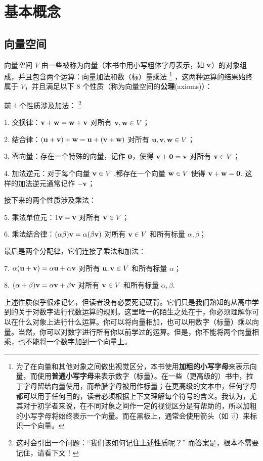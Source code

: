 \chapter{基本概念}\label{chap:01}

\section{向量空间}\label{sec:01-01}
向量空间 $V$ 由一些被称为向量（本书中用小写粗体字母表示，如 $\mathbf{v}$）的对象组成，并且包含两个运算：向量加法和数（标）量乘法
\footnote{为了在向量和其他对象之间做出视觉区分，本书使用\textbf{加粗的小写字母}来表示向量，而使用\textbf{普通小写字母}来表示数字（标量）。在一些（更高级的）书中，拉丁字母留给向量使用，而希腊字母被用作标量；在更高级的文本中，任何字母都可以用于任何目的，读者必须根据上下文理解每个符号的含义。我认为，尤其对于初学者来说，在不同对象之间作一定的视觉区分是有帮助的，所以加粗的小写字母将始终表示一个向量。而在黑板上，通常会使用箭头（如 $\vec{v}$）来标识一个向量。
}
，这两种运算的结果始终属于 $V$，并且满足以下 8 个性质（称为向量空间的\textbf{公理}(axioms)）：

前 4 个性质涉及加法：
\footnote{
这时会引出一个问题：“我们该如何记住上述性质呢？” 而答案是，根本不需要记住，请看下文！
}

1. 交换律：$\mathbf{v} + \mathbf{w} = \mathbf{w} + \mathbf{v}$ 对所有 $\mathbf{v}, \mathbf{w} \in V$；

2. 结合律：$(\mathbf{u} + \mathbf{v}) + \mathbf{w} = \mathbf{u} + (\mathbf{v} + \mathbf{w})$ 对所有 $\mathbf{u}, \mathbf{v}, \mathbf{w} \in V$；

3. 零向量：存在一个特殊的向量，记作 $\mathbf{0}$，使得 $\mathbf{v} + \mathbf{0} = \mathbf{v}$ 对所有 $\mathbf{v} \in V$；

4. 加法逆元：对于每个向量 $\mathbf{v} \in V$ ,都存在一个向量 $\mathbf{w} \in V$ 使得 $\mathbf{v} + \mathbf{w} = \mathbf{0}$. 这样的加法逆元通常记作 $-\mathbf{v}$；

接下来的两个性质涉及乘法：

5. 乘法单位元：$1 \mathbf{v} = \mathbf{v}$ 对所有 $\mathbf{v} \in V$；

6. 乘法结合律：$(\alpha\beta) \mathbf{v} = \alpha(\beta \mathbf{v})$ 对所有 $\mathbf{v} \in V$ 和所有标量 $\alpha, \beta$；

最后是两个分配律，它们连接了乘法和加法：

7. $\alpha (\mathbf{u} + \mathbf{v}) = \alpha \mathbf{u} + \alpha \mathbf{v}$ 对所有 $\mathbf{u}, \mathbf{v} \in V$ 和所有标量 $\alpha$；

8. $(\alpha + \beta) \mathbf{v} = \alpha \mathbf{v} + \beta \mathbf{v}$ 对所有 $\mathbf{v} \in V$ 和所有标量 $\alpha, \beta$.

\begin{remark*}
上述性质似乎很难记忆，但读者没有必要死记硬背。它们只是我们熟知的从高中学到的关于对数字进行代数运算的规则。这里唯一的陌生之处在于，你必须理解你可以在什么对象上进行什么运算。你可以将向量相加，也可以用数字（标量）乘以向量。当然，你可以对数字进行所有你以前学过的运算。但是，你不能将两个向量相乘，也不能将一个数字加到一个向量上。
\end{remark*}

